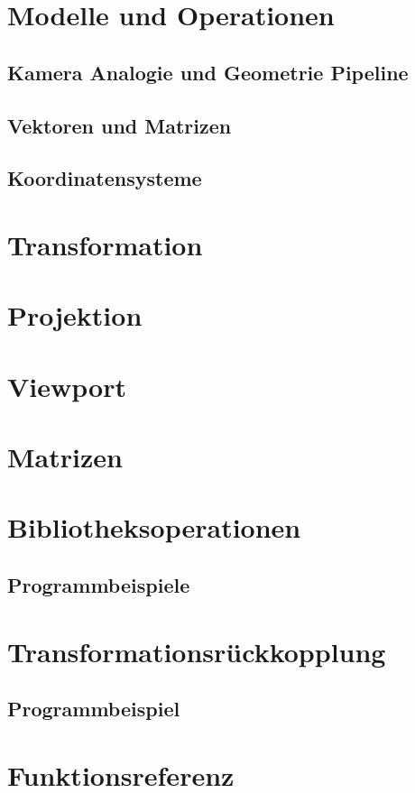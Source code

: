 \section{Modelle und Operationen}

\subsection{Kamera Analogie und Geometrie Pipeline}
\subsection{Vektoren und Matrizen}
\subsection{Koordinatensysteme}

\section{Transformation}

\section{Projektion}

\section{Viewport}

\section{Matrizen}

\section{Bibliotheksoperationen}

\subsection{Programmbeispiele}

\section{Transformationsrückkopplung}
\subsection{Programmbeispiel}

\section{Funktionsreferenz}




